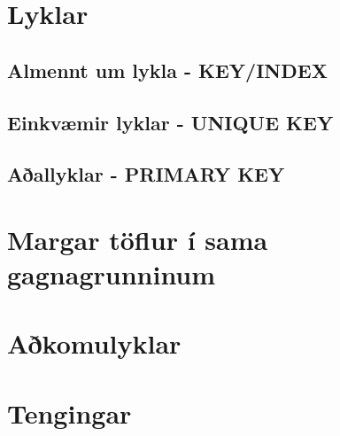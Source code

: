 \section{Lyklar}
\label{undirkafli:lyklar}
\subsection{Almennt um lykla - KEY/INDEX}
\subsection{Einkvæmir lyklar - UNIQUE KEY}
\subsection{Aðallyklar - PRIMARY KEY}
\section{Margar töflur í sama gagnagrunninum}
\section{Aðkomulyklar} %
\section{Tengingar} %
